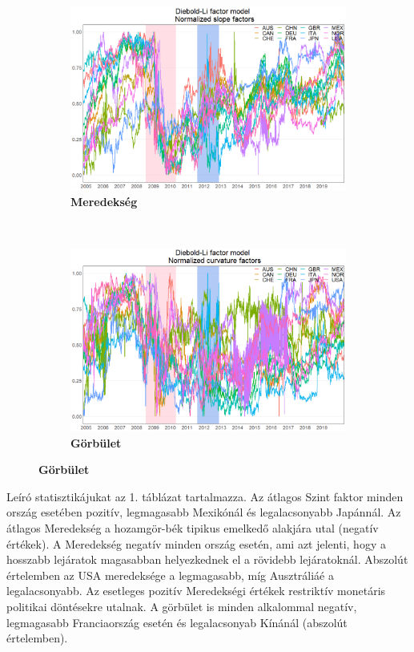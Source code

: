 \documentclass[12pt,bibliography=totoc]{article}
\begin{document}
\begin{figure}[H]
\begin{subfigure}{.5\linewidth}
\end{subfigure}%
\begin{subfigure}{.5\linewidth}
\centering
\includegraphics[width=\linewidth]{Normalizedslope}
\caption{\textbf{Meredekség}}
\end{subfigure}\\[1ex]
\begin{subfigure}{.5\linewidth}
\centering
\includegraphics[width=\linewidth]{Normalizedcurvature}
\caption{\textbf{Görbület}}
\end{subfigure}
\end{figure}


 Leíró statisztikájukat az 1. táblázat tartalmazza. Az átlagos Szint faktor minden ország esetében pozitív, legmagasabb Mexikónál és legalacsonyabb Japánnál. Az átlagos Meredekség a hozamgör-bék tipikus emelkedő alakjára utal (negatív értékek). A Meredekség negatív minden ország esetén, ami azt jelenti, hogy a hosszabb lejáratok magasabban helyezkednek el a rövidebb lejáratoknál. Abszolút értelemben az USA meredeksége a legmagasabb, míg Ausztráliáé a legalacsonyabb. Az esetleges pozitív Meredekségi értékek restriktív monetáris politikai döntésekre utalnak. A görbület is minden alkalommal negatív, legmagasabb Franciaország esetén és legalacsonyab Kínánál (abszolút értelemben).
\end{document}
